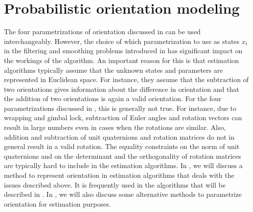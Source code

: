 \section{Probabilistic orientation modeling}
\label{sec:models-probModelingOri}
The four parametrizations of orientation discussed in  can be used interchangeably. However, the choice of which parametrization to use as states $x_t$ in the filtering and smoothing problems introduced in  has significant impact on the workings of the algorithm. An important reason for this is that estimation algorithms typically assume that the unknown states and parameters are represented in Euclidean space. For instance, they assume that the subtraction of two orientations gives information about the difference in orientation and that the addition of two orientations is again a valid orientation. For the four parametrizations discussed in , this is generally not true. For instance, due to wrapping and gimbal lock, subtraction of Euler angles and rotation vectors can result in large numbers even in cases when the rotations are similar. Also, addition and subtraction of unit quaternions and rotation matrices do not in general result in a valid rotation. The equality constraints on the norm of unit quaternions and on the determinant and the orthogonality of rotation matrices are typically hard to include in the estimation algorithms. In , we will discuss a method to represent orientation in estimation algorithms that deals with the issues described above. It is frequently used in the algorithms that will be described in . In , we will also discuss some alternative methods to parametrize orientation for estimation purposes. 

